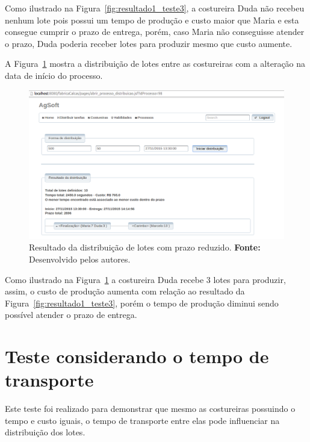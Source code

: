 \par Como ilustrado na Figura~\ref{fig:resultado1_teste3}, a costureira Duda
não recebeu nenhum lote pois possui um tempo de produção e custo maior que Maria e
esta consegue cumprir o prazo de entrega, porém, caso Maria não conseguisse atender
o prazo, Duda poderia receber lotes para produzir mesmo que custo aumente.

A Figura~\ref{fig:resultado2_teste3} mostra a distribuição de lotes entre as
costureiras com a alteração na data de início do processo.

\newpage

\begin{figure}[h!]
	\centerline{\includegraphics[scale=0.3]{./imagens/resultado2_teste3.png}}
	\caption[Resultado da distribuição de lotes com prazo reduzido.]
	{Resultado da distribuição de lotes com prazo reduzido. \textbf{Fonte:} Desenvolvido pelos
	autores.}
	\label{fig:resultado2_teste3}
\end{figure}

\par Como ilustrado na Figura~\ref{fig:resultado2_teste3} a costureira Duda
recebe 3 lotes para produzir, assim, o custo de produção aumenta com relação ao 
resultado da Figura~\ref{fig:resultado1_teste3}, porém o tempo de produção diminui
sendo possível atender o prazo de entrega.


\section{Teste considerando o tempo de transporte}

\par Este teste foi realizado para demonstrar que mesmo as costureiras possuindo
o tempo e custo iguais, o tempo de transporte entre elas pode influenciar na distribuição dos lotes.

